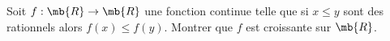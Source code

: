 \exercice

Soit $f : \mb{R} \rightarrow \mb{R}$ une fonction continue telle que si $ x \le y$ sont des rationnels alors $f(x) \le f(y)$. Montrer que $f$ est croissante sur $\mb{R}$.


